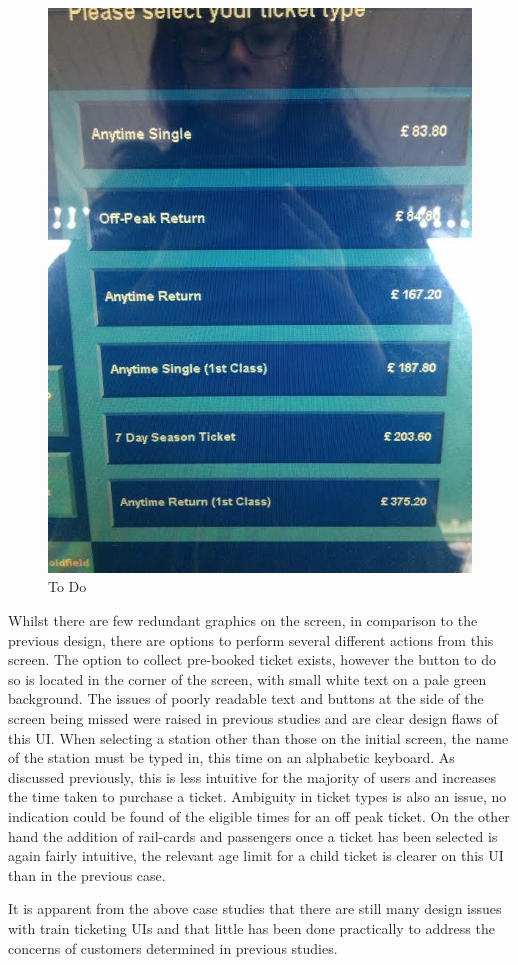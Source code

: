 \begin{figure}[h!]
	\centering
	\includegraphics[width=0.5\linewidth, angle=0, origin=c]{images/image07}
	\caption{To Do}
	\label{fig:midlandType}
\end{figure}

Whilst there are few redundant graphics on the screen, in comparison to the previous design, there are options to perform several different actions from this screen. The option to collect pre-booked ticket exists, however the button to do so is located in the corner of the screen, with small white text on a pale green background. The issues of poorly readable text and buttons at the side of the screen being missed were raised in previous studies and are clear design flaws of this UI. When selecting a station other than those on the initial screen, the name of the station must be typed in, this time on an alphabetic keyboard. As discussed previously, this is less intuitive for the majority of users and increases the time taken to purchase a ticket. Ambiguity in ticket types is also an issue, no indication could be found of the eligible times for an off peak ticket. On the other hand the addition of rail-cards and passengers once a ticket has been selected is again fairly intuitive, the relevant age limit for a child ticket is clearer on this UI than in the previous case.

It is apparent from the above case studies that there are still many design issues with train ticketing UIs and that little has been done practically to address the concerns of customers determined in previous studies. 

